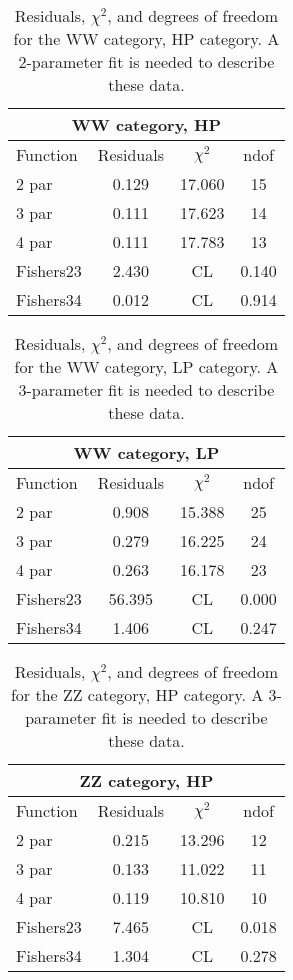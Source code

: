 \begin{table}[htb]
\centering
\begin{tabular}{|l c c c |}
\hline
\multicolumn{4}{|c|}{WW category, HP}\\
\hline
Function & Residuals & $\chi^2$ & ndof \\
\hline
2 par & 0.129 & 17.060 & 15 \\
3 par & 0.111 & 17.623 & 14 \\
4 par & 0.111 & 17.783 & 13 \\
\hline
\hline
Fishers23  & 2.430 & CL &0.140\\
Fishers34  & 0.012 & CL &0.914\\
\hline
\end{tabular}
\caption{Residuals, $\chi^{2}$, and degrees of freedom for the WW category, HP category. A 2-parameter fit is needed to describe these data.}
\label{tab:WW category, HP}
\end{table}
\begin{table}[htb]
\centering
\begin{tabular}{|l c c c |}
\hline
\multicolumn{4}{|c|}{WW category, LP}\\
\hline
Function & Residuals & $\chi^2$ & ndof \\
\hline
2 par & 0.908 & 15.388 & 25 \\
3 par & 0.279 & 16.225 & 24 \\
4 par & 0.263 & 16.178 & 23 \\
\hline
\hline
Fishers23  & 56.395 & CL &0.000\\
Fishers34  & 1.406 & CL &0.247\\
\hline
\end{tabular}
\caption{Residuals, $\chi^{2}$, and degrees of freedom for the WW category, LP category. A 3-parameter fit is needed to describe these data.}
\label{tab:WW category, LP}
\end{table}
\begin{table}[htb]
\centering
\begin{tabular}{|l c c c |}
\hline
\multicolumn{4}{|c|}{ZZ category, HP}\\
\hline
Function & Residuals & $\chi^2$ & ndof \\
\hline
2 par & 0.215 & 13.296 & 12 \\
3 par & 0.133 & 11.022 & 11 \\
4 par & 0.119 & 10.810 & 10 \\
\hline
\hline
Fishers23  & 7.465 & CL &0.018\\
Fishers34  & 1.304 & CL &0.278\\
\hline
\end{tabular}
\caption{Residuals, $\chi^{2}$, and degrees of freedom for the ZZ category, HP category. A 3-parameter fit is needed to describe these data.}
\label{tab:ZZ category, HP}
\end{table}
